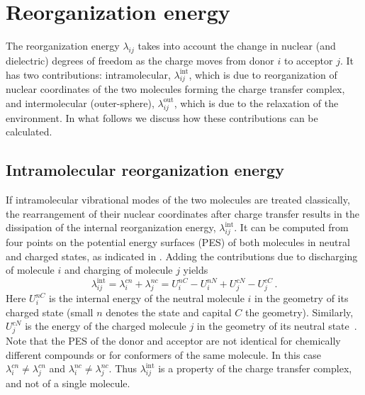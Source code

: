 \section{Reorganization energy}
\label{sec:reorganization}

The reorganization energy $\lambda_{ij}$ takes into account the change in  nuclear (and dielectric) degrees of freedom as the charge moves from donor $i$ to acceptor $j$. It has two contributions: intramolecular, $\lambda^\text{int}_{ij}$, which is due to reorganization of nuclear coordinates of the two molecules forming the charge transfer complex, and intermolecular (outer-sphere), $\lambda^\text{out}_{ij}$, which is due to the relaxation of the environment. In what follows we discuss how these contributions can be calculated.

\subsection{Intramolecular reorganization energy}
\label{sec:inner_reorganization}
If intramolecular vibrational modes of the two molecules are treated classically, the rearrangement of their nuclear coordinates after charge transfer results in the dissipation of the internal reorganization energy, $\lambda_{ij}^\text{int}$. It can be computed from four points on the potential energy surfaces (PES) of both molecules in neutral and charged states, as indicated in . Adding the contributions due to discharging of molecule $i$ and charging of molecule $j$ yields~\cite{bredas_charge-transfer_2004}
\begin{equation}
\lambda_{ij}^\text{int} =\lambda_{i}^{cn}+\lambda_{j}^{nc}=U_{i}^{nC}-U_{i}^{nN}+U_{j}^{cN}-U_{j}^{cC}\,.
\label{equ:lambdas}
\end{equation}
Here $U_{i}^{nC}$ is the internal energy of the neutral molecule $i$ in the geometry of its charged state (small $n$ denotes the state and capital $C$ the geometry). Similarly, $U_{j}^{cN}$ is the energy of the charged molecule $j$ in  the geometry of its neutral state~\cite{note_spectrum}.
%
Note that the PES of the donor and acceptor are not identical for chemically different compounds or for conformers of the same molecule. In this case $\lambda_{i}^{cn} \ne \lambda_{j}^{cn}$ and  $\lambda_{i}^{nc} \ne \lambda_{j}^{nc}$. Thus $\lambda_{ij}^\text{int}$ is a property of the charge transfer complex, and not of a single molecule.

